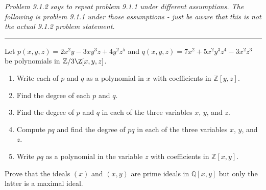 \documentclass[12pt,letterpaper]{hmcpset}
\newcommand{\Zz}{\mathbb{Z}}
\newcommand{\Qq}{\mathbb{Q}}
\begin{document}
\begin{problem}[9.1.2]
	\textit{Problem 9.1.2 says to repeat problem 9.1.1 under different assumptions. The following is problem 9.1.1 under those assumptions - just be aware that this is not the actual 9.1.2 problem statement.}
	
	\hrule \vspace*{1mm}
	
	Let $p(x,y,z)=2x^2y-3xy^3z+4y^2z^5$ and $q(x,y,z)=7x^2+5x^2y^3z^4-3x^2z^3$ be polynomials in $\Zz/3\Z[x,y,z]$.
	\begin{enumerate}
		\item Write each of $p$ and $q$ as a polynomial in $x$ with coefficients in $\Zz[y,z]$.
		\item Find the degree of each $p$ and $q$.
		\item Find the degree of $p$ and $q$ in each of the three variables $x$, $y$, and $z$.
		\item Compute $pq$ and find the degree of $pq$ in each of the three variables $x$, $y$, and $z$.
		\item Write $pq$ as a polynomial in the variable $z$ with coefficients in $\Zz[x,y]$.
	\end{enumerate}
\end{problem}
\begin{solution}
	\vfill
\end{solution}
\newpage

\begin{problem}[9.1.4]
  Prove that the ideals $(x)$ and $(x,y)$ are prime ideals in $\Qq[x,y]$ but only the latter is a maximal ideal.
\end{problem}
\begin{solution}
	\vfill
\end{solution}
\end{document}
